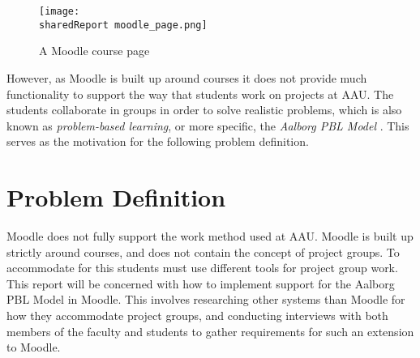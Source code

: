\begin{figure}
\texttt{[image: \\sharedReport moodle\_page.png]}
\caption{A Moodle course page}
\label{fig:MoodleCourse}
\end{figure}

However, as Moodle is built up around courses it does not provide much functionality to support the way that students work on projects at AAU. 
The students collaborate in groups in order to solve realistic problems, which is also known as \emph{problem-based learning}, or more specific, the \emph{Aalborg PBL Model} \citep{pbl}. This serves as the motivation for the following problem definition.

\section{Problem Definition}
\label{sec:problemDef}
Moodle does not fully support the work method used at AAU. 
Moodle is built up strictly around courses, and does not contain the concept of project groups. 
To accommodate for this students must use different tools for project group work.
This report will be concerned with how to implement support for the Aalborg PBL Model in Moodle. 
This involves researching other systems than Moodle for how they accommodate project groups, and conducting interviews with both members of the faculty and students to gather requirements for such an extension to Moodle.
